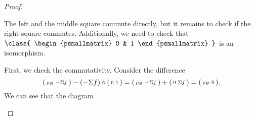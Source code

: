 \begin{proof}
\begin{enumerate}[label={(\bfseries TR\arabic*)}]
{\begin{center}
            \end{center}
            The left and the middle square commute directly, but it remains to check if the right square commutes. Additionally, we need to check that \( \class{
                \begin{psmallmatrix}
                    0 & 1
                \end{psmallmatrix}
            } \) is an isomorphism.

            First, we check the commutativity. Consider the difference
            \[
                \begin{psmallmatrix}
                    \rho_B & -\Sigma f
                \end{psmallmatrix}
                -
                (-\Sigma f) \circ
                \begin{psmallmatrix}
                    0 & 1
                \end{psmallmatrix}
                =
                \begin{psmallmatrix}
                    \rho_B & -\Sigma f
                \end{psmallmatrix}
                +
                \begin{psmallmatrix}
                    0 & \Sigma f
                \end{psmallmatrix}
                =
                \begin{psmallmatrix}
                    \rho_B & 0
                \end{psmallmatrix}.
            \]
            We can see that the diagram
            \begin{center}
\end{center}}
\end{enumerate}
\end{proof}
